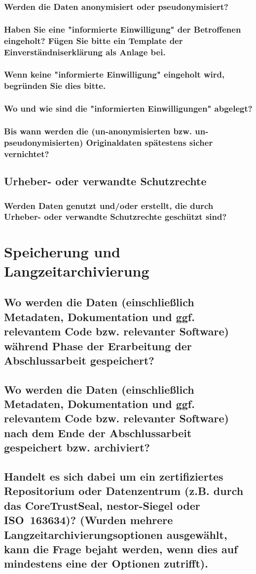 \subsubsection*{Werden die Daten anonymisiert oder pseudonymisiert?}
\subsubsection*{Haben Sie eine "informierte Einwilligung" der Betroffenen eingeholt? Fügen Sie bitte ein Template der Einverständniserklärung als Anlage bei.}
\subsubsection*{Wenn keine "informierte Einwilligung" eingeholt wird, begründen Sie dies bitte.}
\subsubsection*{Wo und wie sind die "informierten Einwilligungen" abgelegt?}
\subsubsection*{Bis wann werden die (un-anonymisierten bzw. un-pseudonymisierten) Originaldaten spätestens sicher vernichtet?}
\subsection*{Urheber- oder verwandte Schutzrechte}
\subsubsection*{Werden Daten genutzt und/oder erstellt, die durch Urheber- oder verwandte Schutzrechte geschützt sind?}

\section{Speicherung und Langzeitarchivierung}
\subsection*{Wo werden die Daten (einschließlich Metadaten, Dokumentation und ggf. relevantem Code bzw. relevanter Software) während Phase der Erarbeitung der Abschlussarbeit gespeichert?}
\subsection*{Wo werden die Daten (einschließlich Metadaten, Dokumentation und ggf. relevantem Code bzw. relevanter Software) nach dem Ende der Abschlussarbeit gespeichert bzw. archiviert?}
\subsection*{Handelt es sich dabei um ein zertifiziertes Repositorium oder Datenzentrum (z.B. durch das CoreTrustSeal, nestor-Siegel oder ISO~163634)? (Wurden mehrere Langzeitarchivierungsoptionen ausgewählt, kann die Frage bejaht werden, wenn dies auf mindestens eine der Optionen zutrifft).}